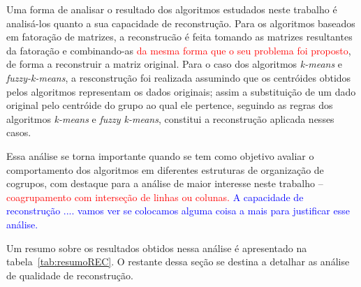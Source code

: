 \documentclass[
    12pt,                %
    oneside,            %
    a4paper,            %
    english,            %
    brazil                %
    ]{abntex2ppgsi}
\begin{document}
Uma forma de analisar o resultado dos algoritmos estudados neste trabalho é analisá-los quanto a sua capacidade de reconstrução. Para os algoritmos baseados em fatoração de matrizes, a reconstrucão é feita tomando as matrizes resultantes da fatoração e combinando-as \textcolor{red}{da mesma forma que o seu problema foi proposto}, de forma a reconstruir a matriz original. Para o caso dos algoritmos \textit{k-means} e \textit{fuzzy-k-means}, a resconstrução foi realizada assumindo que os centróides obtidos pelos algoritmos representam os dados originais; assim a substituição de um dado original pelo centróide do grupo ao qual ele pertence, seguindo as regras dos algoritmos \textit{k-means} e \textit{fuzzy k-means}, constitui a reconstrução aplicada nesses casos.

Essa análise se torna importante quando se tem como objetivo avaliar o comportamento dos algoritmos em diferentes estruturas de organização de cogrupos, com destaque para a análise de maior interesse neste trabalho -- \textcolor{red}{coagrupamento com interseção de linhas ou colunas.} \textcolor{blue}{A capacidade de reconstrução .... vamos ver se colocamos alguma coisa a mais para justificar esse análise.} 

Um resumo sobre os resultados obtidos nessa análise é apresentado na tabela~\ref{tab:resumoREC}. O restante dessa seção se destina a detalhar as análise de qualidade de reconstrução.
\end{document}

